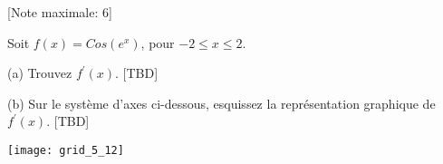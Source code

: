 \begin{question}
  \hspace*{\fill} [Note maximale: 6]\par
  \medskip
  \noindent Soit $f(x) = Cos(e^x)$, pour $-2 \le x \le 2$.\par
  \medskip
  (a) Trouvez $f^\prime(x)$.\hspace*{\fill} [TBD]\par
  \medskip
  (b) Sur le système d'axes ci-dessous, esquissez la représentation graphique de $f^\prime(x)$.\hspace*{\fill} [TBD]\par
  \medskip
  \begin{flushleft}
    \texttt{[image: grid\_5\_12]}\par
  \end{flushleft}
\end{question}


